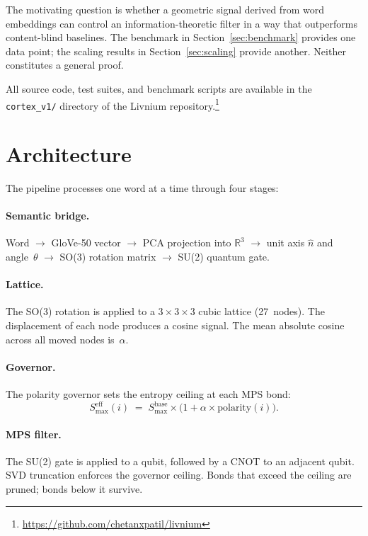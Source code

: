 \documentclass{article}
\begin{document}
The motivating question is whether a geometric signal derived from word embeddings can control an information-theoretic filter in a way that outperforms content-blind baselines.  The benchmark in Section~\ref{sec:benchmark} provides one data point; the scaling results in Section~\ref{sec:scaling} provide another.  Neither constitutes a general proof.

All source code, test suites, and benchmark scripts are available in the \texttt{cortex\_v1/} directory of the Livnium repository.\footnote{\url{https://github.com/chetanxpatil/livnium}}

\section{Architecture}

The pipeline processes one word at a time through four stages:

\paragraph{Semantic bridge.}
Word $\to$ GloVe-50 vector $\to$ PCA projection into $\mathbb{R}^{3}$ $\to$ unit axis $\hat{n}$ and angle~$\theta$ $\to$ SO(3) rotation matrix $\to$ SU(2) quantum gate.

\paragraph{Lattice.}
The SO(3) rotation is applied to a $3\!\times\!3\!\times\!3$ cubic lattice (27~nodes).  The displacement of each node produces a cosine signal.  The mean absolute cosine across all moved nodes is~$\alpha$.

\paragraph{Governor.}
The polarity governor sets the entropy ceiling at each MPS bond:
\begin{equation}
  S_{\max}^{\mathrm{eff}}(i)
  \;=\;
  S_{\max}^{\mathrm{base}}
  \times
  \bigl(1 + \alpha \times \mathrm{polarity}(i)\bigr).
  \label{eq:governor}
\end{equation}

\paragraph{MPS filter.}
The SU(2) gate is applied to a qubit, followed by a CNOT to an adjacent qubit.  SVD truncation enforces the governor ceiling.  Bonds that exceed the ceiling are pruned; bonds below it survive.
\end{document}
